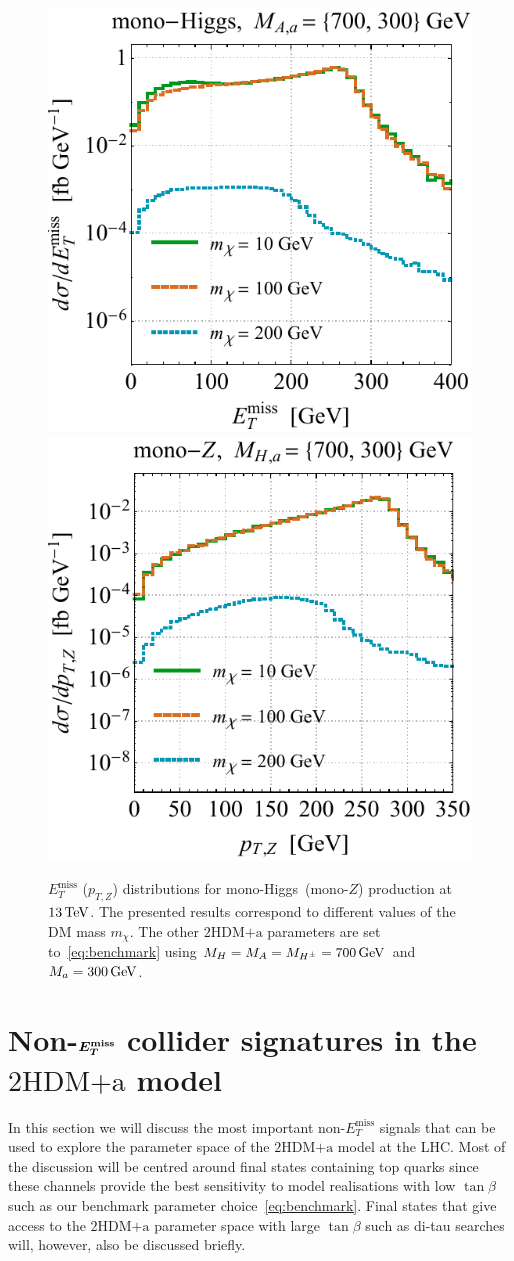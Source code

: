 \documentclass[a4paper, 11pt,notoc]{article}
\newcommand{\MET}{\ensuremath{E_T^\mathrm{miss}}\xspace}
\newcommand{\mA}{\ensuremath{M_{A}}\xspace}
\newcommand{\ma}{\ensuremath{M_{a}}\xspace}
\newcommand{\mH}{\ensuremath{M_{H}}\xspace}
\newcommand{\mHc}{\ensuremath{M_{H^{\pm}}}\xspace}
\newcommand{\hdma}{\ensuremath{\textrm{2HDM+a}}\xspace}
\def\bm#1{\mbox{\boldmath$#1$\unboldmath}}
\begin{document}
\begin{figure}[t!]
\centering
\includegraphics[height=0.45\textwidth]{mdml.pdf} \qquad 
\includegraphics[height=0.45\textwidth]{mdmr.pdf}
\vspace{2mm}
\caption{\label{fig:mdmvar} $\MET$ ($p_{T,Z}$) distributions for mono-Higgs~(mono-$Z$) production at $13 \, {\rm TeV}$. The presented results correspond to different values of the DM mass $m_\chi$. The other \hdma parameters are set to~\eqref{eq:benchmark} using $\mH = \mA = \mHc = 700 \, {\rm GeV}$ and $\ma = 300 \, {\rm GeV}$. }
\end{figure}


\section{Non-$\bm{E_T^{\rm miss}}$ collider signatures  in the \hdma model}
\label{sec:nonMET}

In this section we will discuss the most important non-$\MET$ signals that can be used to explore the parameter space of the \hdma model at the LHC. Most of the discussion will be centred around final states containing top quarks since these channels provide the best sensitivity to model realisations with low $\tan \beta$ such as our benchmark parameter choice~\eqref{eq:benchmark}. Final states that give access to the \hdma parameter space with large $\tan \beta$ such as di-tau searches will, however, also be discussed briefly. 
\end{document}
